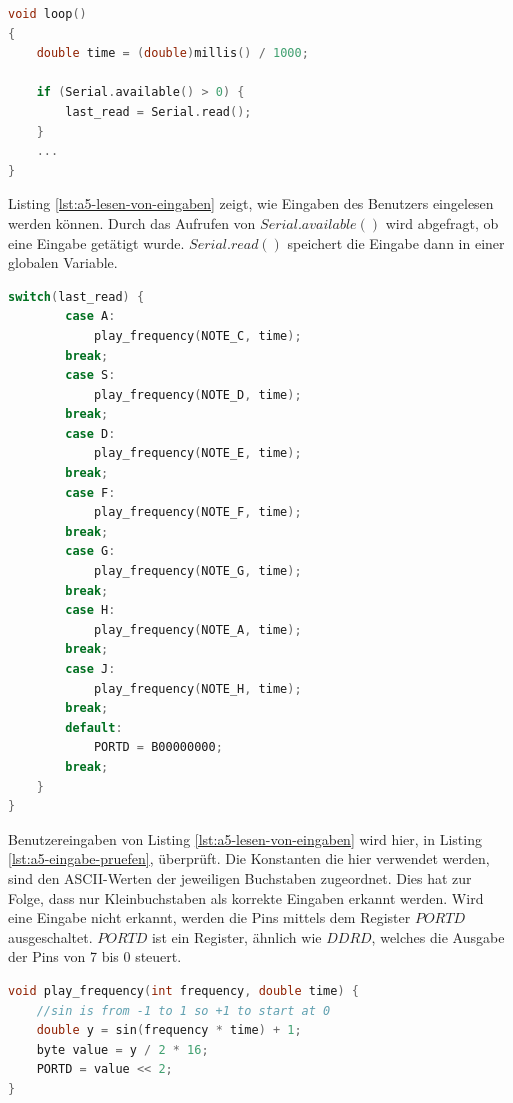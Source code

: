 \begin{lstlisting}[language=C,label={lst:a5-lesen-von-eingaben}, caption={Lesen von Eingaben}]
void loop()
{
    double time = (double)millis() / 1000;

    if (Serial.available() > 0) {
        last_read = Serial.read();
    }
    ...
}
\end{lstlisting}

\newpage

Listing \ref{lst:a5-lesen-von-eingaben} zeigt, wie Eingaben des Benutzers eingelesen werden können.
Durch das Aufrufen von $Serial.available()$ wird abgefragt, ob eine Eingabe getätigt wurde.
$Serial.read()$ speichert die Eingabe dann in einer globalen Variable.

\begin{lstlisting}[language=C,label={lst:a5-eingabe-pruefen}, caption={Prüfen von Eingaben}]
    switch(last_read) {
        case A:
            play_frequency(NOTE_C, time);
        break;
        case S:
            play_frequency(NOTE_D, time);
        break;
        case D:
            play_frequency(NOTE_E, time);
        break;
        case F:
            play_frequency(NOTE_F, time);
        break;
        case G:
            play_frequency(NOTE_G, time);
        break;
        case H:
            play_frequency(NOTE_A, time);
        break;
        case J:
            play_frequency(NOTE_H, time);
        break;
        default:
            PORTD = B00000000;
        break;
    }
}
\end{lstlisting}

Benutzereingaben von Listing \ref{lst:a5-lesen-von-eingaben} wird hier, in Listing \ref{lst:a5-eingabe-pruefen}, überprüft.
Die Konstanten die hier verwendet werden, sind den ASCII-Werten der jeweiligen Buchstaben zugeordnet.
Dies hat zur Folge, dass nur Kleinbuchstaben als korrekte Eingaben erkannt werden.
Wird eine Eingabe nicht erkannt, werden die Pins mittels dem Register $PORTD$ ausgeschaltet.
$PORTD$ ist ein Register, ähnlich wie $DDRD$, welches die Ausgabe der Pins von 7 bis 0 steuert.

\newpage

\begin{lstlisting}[language=C,label={lst:a5-play-frequency}, caption={Abspielen von Frequenzen}]
void play_frequency(int frequency, double time) {
    //sin is from -1 to 1 so +1 to start at 0
    double y = sin(frequency * time) + 1;
    byte value = y / 2 * 16;
    PORTD = value << 2;
}
\end{lstlisting}

